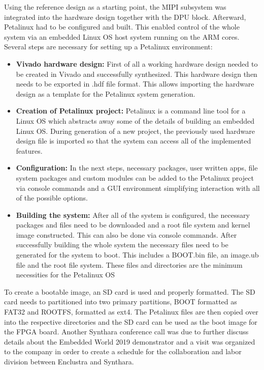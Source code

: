 Using the reference design as a starting point, the \ac{MIPI} subsystem was integrated into the hardware design together with the \ac{DPU} block. Afterward, Petalinux had to be configured and built. This enabled control of the whole system via an embedded Linux \ac{OS} host system running on the ARM cores. Several steps are necessary for setting up a Petalinux environment:
\begin{itemize}
	\item \textbf{Vivado hardware design:} First of all a working hardware design needed to be created in Vivado and successfully synthesized. This hardware design then needs to be exported in .hdf file format. This allows importing the hardware design as a template for the Petalinux system generation.
	\item \textbf{Creation of Petalinux project:} Petalinux is a command line tool for a Linux \ac{OS} which abstracts away some of the details of building an embedded Linux \ac{OS}. During generation of a new project, the previously used hardware design file is imported so that the system can access all of the implemented features.
	\item \textbf{Configuration:} In the next steps, necessary packages, user written apps, file system packages and custom modules can be added to the Petalinux project via console commands and a \ac{GUI} environment simplifying interaction with all of the possible options.
	\item \textbf{Building the system:} After all of the system is configured, the necessary packages and files need to be downloaded and a root file system and kernel image constructed. This can also be done via console commands. After successfully building the whole system the necessary files need to be generated for the system to boot. This includes a BOOT.bin file, an image.ub file and the root file system. These files and directories are the minimum necessities for the Petalinux \ac{OS}
\end{itemize}
To create a bootable image, an SD card is used and properly formatted. The SD card needs to partitioned into two primary partitions, BOOT formatted as FAT32 and ROOTFS, formatted as ext4. The Petalinux files are then copied over into the respective directories and the SD card can be used as the boot image for the \ac{FPGA} board.
Another Synthara conference call was due to further discuss details about the Embedded World 2019 demonstrator and a visit was organized to the company in order to create a schedule for the collaboration and labor division between Enclustra and Synthara.